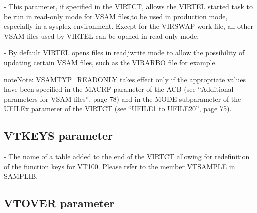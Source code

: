 \documentclass[letterpaper,10pt,english]{sphinxmanual}
\begin{document}
 - This parameter, if specified in the VIRTCT, allows the VIRTEL started task to be run in read-only mode for VSAM files,to be used in production mode, especially in a sysplex environment. Except for the VIRSWAP work file, all other VSAM files used by VIRTEL can be opened in read-only mode.

 - By default VIRTEL opens files in read/write mode to allow the possibility of updating certain VSAM files, such as the VIRARBO file for example.

\begin{sphinxadmonition}{note}{Note:}
VSAMTYP=READONLY takes effect only if the appropriate values have been specified in the MACRF parameter of the ACB (see “Additional parameters for VSAM files”, page 78) and in the MODE subparameter of the UFILEx parameter of the VIRTCT (see “UFILE1 to UFILE20”, page 75).
\end{sphinxadmonition}


\subsection{VTKEYS parameter}
\label{\detokenize{Installation_Guide:index-137}}\label{\detokenize{Installation_Guide:vtkeys-parameter}}
\begin{sphinxVerbatim}[commandchars=\\\{\}]
 
\end{sphinxVerbatim}

 - The name of a table added to the end of the VIRTCT allowing for redefinition of the function keys for VT100. Please refer to the member VTSAMPLE in SAMPLIB.


\subsection{VTOVER parameter}
\label{\detokenize{Installation_Guide:id7}}\label{\detokenize{Installation_Guide:index-138}}
\begin{sphinxVerbatim}[commandchars=\\\{\}]
 
\end{sphinxVerbatim}
\end{document}
